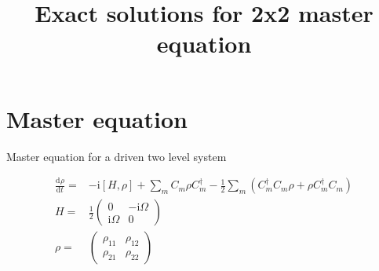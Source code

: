 \documentclass[10pt,fleqn]{article}
\title{Exact solutions for 2x2 master equation}
\newcommand{\ud}{\mathrm{d}}
\newcommand{\ui}{\mathrm{i}}
\newcommand{\eqar}[1]
{
  \begin{align*}
    #1
  \end{align*}
}
\newcommand{\paren}[1]{{\left({#1}\right)}}
\newcommand{\sqr}[1]{{\left[{#1}\right]}}
\newcommand{\diff}[3][{}]{{\frac{\ud^{#1} {#2}}{\ud {#3}{}^{#1}}}}
\begin{document}
\maketitle

\section{Master equation}
Master equation for a driven two level system
\eqar{
  \diff{\rho}{t}=&-\ui\sqr{H, \rho}+\sum_m C_m\rho C^\dagger_m-\frac12\sum_m\paren{C^\dagger_m C_m\rho+\rho C^\dagger_m C_m}\\
  H=&\frac12\begin{pmatrix}
    0&-\ui\Omega\\
    \ui\Omega&0
  \end{pmatrix}\\
  \rho=&\begin{pmatrix}
    \rho_{11}&\rho_{12}\\
    \rho_{21}&\rho_{22}
  \end{pmatrix}\\
}
\end{document}
